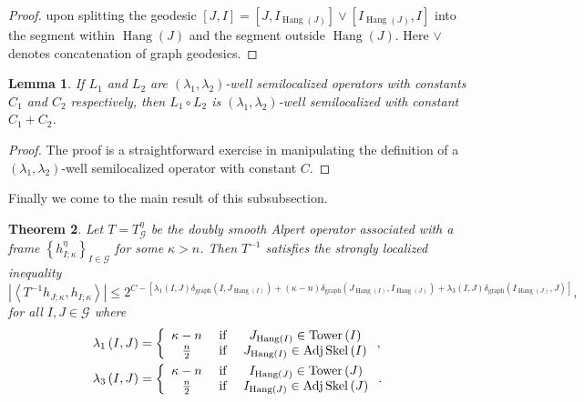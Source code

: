 \documentclass{amsart}%
\newtheorem{theorem}{Theorem}
\theoremstyle{plain}
\newtheorem{lemma}[theorem]{Lemma}
\numberwithin{equation}{section}
\begin{document}
\begin{proof}
upon splitting the geodesic $\left[  J,I\right]  =\left[
J,I_{\operatorname*{Hang}\left(  J\right)  }\right]  \vee\left[
I_{\operatorname*{Hang}\left(  J\right)  },I\right]  $ into the segment within
$\operatorname*{Hang}\left(  J\right)  $ and the segment outside
$\operatorname*{Hang}\left(  J\right)  $. Here $\vee$ denotes concatenation of
graph geodesics.
\end{proof}

\begin{lemma}
\label{comp semi}If $L_{1}$ and $L_{2}$ are $\left(  \lambda_{1},\lambda
_{2}\right)  $-well semilocalized operators with constants $C_{1}$ and $C_{2}$
respectively, then $L_{1}\circ L_{2}$ is $\left(  \lambda_{1},\lambda
_{2}\right)  $-well semilocalized with constant $C_{1}+C_{2}$.
\end{lemma}

\begin{proof}
The proof is a straightforward exercise in manipulating the definition of a
$\left(  \lambda_{1},\lambda_{2}\right)  $-well semilocalized operator with
constant $C$.
\end{proof}

Finally we come to the main result of this subsubsection.

\begin{theorem}
Let $T=T_{\mathcal{G}}^{\eta}$ be the doubly smooth Alpert operator associated
with a frame $\left\{  h_{I;\kappa}^{\eta}\right\}  _{I\in\mathcal{G}}$ for
some $\kappa>n$. Then $T^{-1}$ satisfies the strongly localized inequality%
\[
\left\vert \left\langle T^{-1}h_{J;\kappa},h_{I;\kappa}\right\rangle
\right\vert \leq2^{C-\left[  \lambda_{1}\left(  I,J\right)  \delta
_{\operatorname*{graph}}\left(  I,J_{\operatorname*{Hang}\left(  I\right)
}\right)  +\left(  \kappa-n\right)  \delta_{\operatorname*{graph}}\left(
J_{\operatorname*{Hang}\left(  I\right)  },I_{\operatorname*{Hang}\left(
J\right)  }\right)  +\lambda_{3}\left(  I,J\right)  \delta
_{\operatorname*{graph}}\left(  I_{\operatorname*{Hang}\left(  J\right)
},J\right)  \right]  },
\]
for all $I,J\in\mathcal{G}$ where%
\begin{align*}
\lambda_{1}\left(  I,J\right)    & =\left\{
\begin{array}
[c]{ccc}%
\kappa-n & \text{ if } & J_{\operatorname*{Hang}\left(  I\right)  }%
\in\operatorname*{Tower}\left(  I\right)  \\
\frac{n}{2} & \text{ if } & J_{\operatorname*{Hang}\left(  I\right)  }%
\in\operatorname*{Adj}\operatorname*{Skel}\left(  I\right)
\end{array}
\right.  ,\\
\lambda_{3}\left(  I,J\right)    & =\left\{
\begin{array}
[c]{ccc}%
\kappa-n & \text{ if } & I_{\operatorname*{Hang}\left(  J\right)  }%
\in\operatorname*{Tower}\left(  J\right)  \\
\frac{n}{2} & \text{ if } & I_{\operatorname*{Hang}\left(  J\right)  }%
\in\operatorname*{Adj}\operatorname*{Skel}\left(  J\right)
\end{array}
\right.  .
\end{align*}

\end{theorem}
\end{document}
